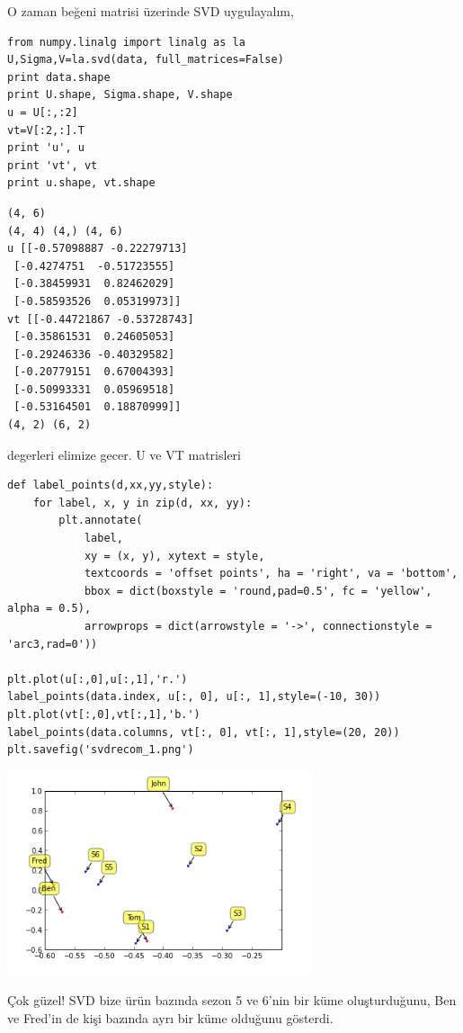 \documentclass[12pt,fleqn]{article}\usepackage{../../common}
\begin{document}
O zaman beğeni matrisi üzerinde SVD uygulayalım,

\begin{verbatim}
from numpy.linalg import linalg as la
U,Sigma,V=la.svd(data, full_matrices=False)
print data.shape
print U.shape, Sigma.shape, V.shape
u = U[:,:2]
vt=V[:2,:].T
print 'u', u
print 'vt', vt
print u.shape, vt.shape
\end{verbatim}

\begin{verbatim}
(4, 6)
(4, 4) (4,) (4, 6)
u [[-0.57098887 -0.22279713]
 [-0.4274751  -0.51723555]
 [-0.38459931  0.82462029]
 [-0.58593526  0.05319973]]
vt [[-0.44721867 -0.53728743]
 [-0.35861531  0.24605053]
 [-0.29246336 -0.40329582]
 [-0.20779151  0.67004393]
 [-0.50993331  0.05969518]
 [-0.53164501  0.18870999]]
(4, 2) (6, 2)
\end{verbatim}

degerleri elimize gecer. U ve VT matrisleri 

\begin{verbatim}
def label_points(d,xx,yy,style):
    for label, x, y in zip(d, xx, yy):
        plt.annotate(
            label, 
            xy = (x, y), xytext = style,
            textcoords = 'offset points', ha = 'right', va = 'bottom',
            bbox = dict(boxstyle = 'round,pad=0.5', fc = 'yellow', alpha = 0.5),
            arrowprops = dict(arrowstyle = '->', connectionstyle = 'arc3,rad=0'))

plt.plot(u[:,0],u[:,1],'r.')
label_points(data.index, u[:, 0], u[:, 1],style=(-10, 30))
plt.plot(vt[:,0],vt[:,1],'b.')
label_points(data.columns, vt[:, 0], vt[:, 1],style=(20, 20))
plt.savefig('svdrecom_1.png')
\end{verbatim}

\includegraphics[height=6cm]{svdrecom_1.png}

Çok güzel! SVD bize ürün bazında sezon 5 ve 6'nin bir küme
oluşturduğunu, Ben ve Fred'in de kişi bazında ayrı bir küme olduğunu
gösterdi.
\end{document}
